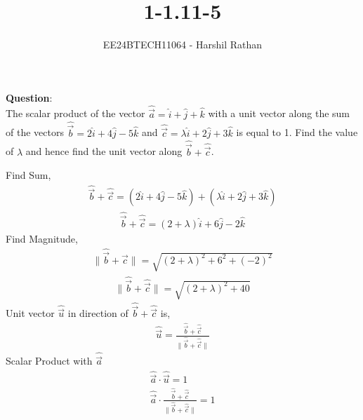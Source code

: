 \documentclass[journal]{IEEEtran}
\begin{document}

\vspace{3cm}

\title{1-1.11-5}
\author{EE24BTECH11064 - Harshil Rathan }
{\let\newpage\relax\maketitle}

\renewcommand{\thefigure}{\theenumi}
\renewcommand{\thetable}{\theenumi}
\setlength{\intextsep}{10pt} %


\renewcommand{\thetable}{\theenumi}
\textbf{Question}:\\
The scalar product of the vector $\hat{\vec{a}}=\hat{i}+\hat{j}+\hat{k}$ with a unit vector along the sum of the vectors $\hat{\vec{b}}=2\hat{i}+4\hat{j}-5\hat{k}$ and $\hat{\vec{c}}=\lambda\hat{i}+2\hat{j}+3\hat{k}$ is equal to 1. Find the value of $\lambda$ and hence find the unit vector along $\hat{\vec{b}}+\hat{\vec{c}}$.
\\
\solution 
\begin{table}[h!]
    \centering
    
\end{table}
Find Sum,
\begin{align}
     \hat{\vec{b}}+\hat{\vec{c}}= (2\hat{i}+4\hat{j}-5\hat{k})+(\lambda\hat{i}+2\hat{j}+3\hat{k})
\end{align}    
\begin{align}    
\hat{\vec{b}}+\hat{\vec{c}}=(2+\lambda)\hat{i}+6\hat{j}-2\hat{k}
\end{align}
Find Magnitude,
\begin{align}
\|\hat{\vec{b}}+\hat{\vec{c}}\|=\sqrt{(2+\lambda)^2+6^2+(-2)^2}
\end{align}
\begin{align}
\|\hat{\vec{b}}+\hat{\vec{c}}\|=\sqrt{(2+\lambda)^2+40}
\end{align}
Unit vector $\hat{\vec{u}}$ in direction of $\hat{\vec{b}}+\hat{\vec{c}}$ is,
\begin{align}
\hat{\vec{u}}=\frac{\hat{\vec{b}}+\hat{\vec{c}}}{\|\hat{\vec{b}}+\hat{\vec{c}}\|}
\end{align}
Scalar Product with $\hat{\vec{a}}$
\begin{align}
    \hat{\vec{a}} \cdot \hat{\vec{u}} =1\\
    \hat{\vec{a}} \cdot \frac{\hat{\vec{b}}+\hat{\vec{c}}}{\|\hat{\vec{b}}+\hat{\vec{c}}\|} =1
\end{align}
\end{document}
